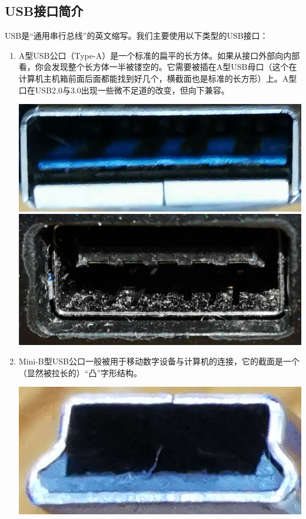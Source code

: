 \subsection{USB接口简介}
USB是“通用串行总线”的英文缩写。我们主要使用以下类型的USB接口：
\begin{enumerate}
	\item A型USB公口（Type-A）是一个标准的扁平的长方体。如果从接口外部向内部看，你会发现整个长方体一半被镂空的。它需要被插在A型USB母口（这个在计算机主机箱前面后面都能找到好几个，横截面也是标准的长方形）上。A型口在USB2.0与3.0出现一些微不足道的改变，但向下兼容。
	\begin{center}
		\includegraphics[scale=0.15]{pic/A-USB-1}\includegraphics[scale=0.05]{pic/A-USB-2}
	\end{center}
	\item Mini-B型USB公口一般被用于移动数字设备与计算机的连接，它的截面是一个（显然被拉长的）“凸”字形结构。
	\begin{center}
		\includegraphics[scale=0.05]{pic/Mini-USB-B-1}

\end{center}
\end{enumerate}
